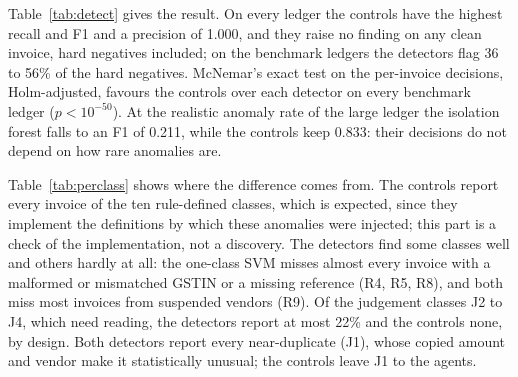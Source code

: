 \documentclass[conference]{IEEEtran}
\begin{document}
Table~\ref{tab:detect} gives the result. On every ledger the controls have the highest recall and F1 and a precision of 1.000, and they raise no finding on any clean invoice, hard negatives included; on the benchmark ledgers the detectors flag 36 to 56\% of the hard negatives. McNemar's exact test on the per-invoice decisions, Holm-adjusted, favours the controls over each detector on every benchmark ledger ($p<10^{-50}$). At the realistic anomaly rate of the large ledger the isolation forest falls to an F1 of 0.211, while the controls keep 0.833: their decisions do not depend on how rare anomalies are.

Table~\ref{tab:perclass} shows where the difference comes from. The controls report every invoice of the ten rule-defined classes, which is expected, since they implement the definitions by which these anomalies were injected; this part is a check of the implementation, not a discovery. The detectors find some classes well and others hardly at all: the one-class SVM misses almost every invoice with a malformed or mismatched GSTIN or a missing reference (R4, R5, R8), and both miss most invoices from suspended vendors (R9). Of the judgement classes J2 to J4, which need reading, the detectors report at most 22\% and the controls none, by design. Both detectors report every near-duplicate (J1), whose copied amount and vendor make it statistically unusual; the controls leave J1 to the agents.
\end{document}

